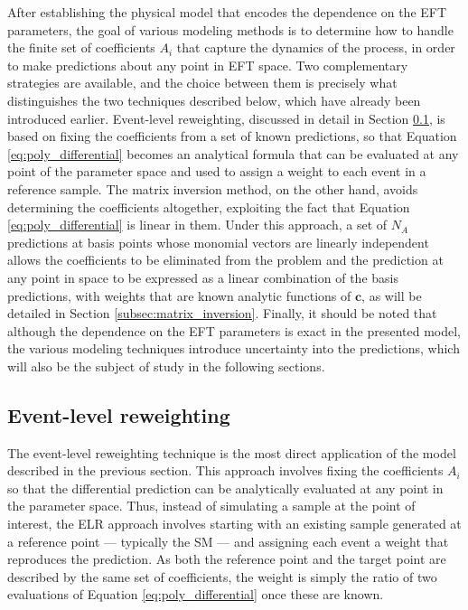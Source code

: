 After establishing the physical model that encodes the dependence on the EFT parameters, the goal of various modeling methods is to determine how to handle the finite set of coefficients $A_i$ that capture the dynamics of the process, in order to make predictions about any point in EFT space. Two complementary strategies are available, and the choice between them is precisely what distinguishes the two techniques described below, which have already been introduced earlier. Event-level reweighting, discussed in detail in Section \ref{subsec:ELR}, is based on fixing the coefficients from a set of known predictions, so that Equation \ref{eq:poly_differential} becomes an analytical formula that can be evaluated at any point of the parameter space and used to assign a weight to each event in a reference sample. The matrix inversion method, on the other hand, avoids determining the coefficients altogether, exploiting the fact that Equation \ref{eq:poly_differential} is linear in them. Under this approach, a set of $N_A$ predictions at basis points whose monomial vectors are linearly independent allows the coefficients to be eliminated from the problem and the prediction at any point in space to be expressed as a linear combination of the basis predictions, with weights that are known analytic functions of $\mathbf{c}$, as will be detailed in Section \ref{subsec:matrix_inversion}. Finally, it should be noted that although the dependence on the EFT parameters is exact in the presented model, the various modeling techniques introduce uncertainty into the predictions, which will also be the subject of study in the following sections.



\subsection{Event-level reweighting}
\label{subsec:ELR}
The event-level reweighting technique is the most direct application of the model described in the previous section. This approach involves fixing the coefficients $A_i$ so that the differential prediction can be analytically evaluated at any point in the parameter space. Thus, instead of simulating a sample at the point of interest, the ELR approach involves starting with an existing sample generated at a reference point — typically the SM — and assigning each event a weight that reproduces the prediction. As both the reference point and the target point are described by the same set of coefficients, the weight is simply the ratio of two evaluations of Equation \ref{eq:poly_differential} once these are known.\medskip

